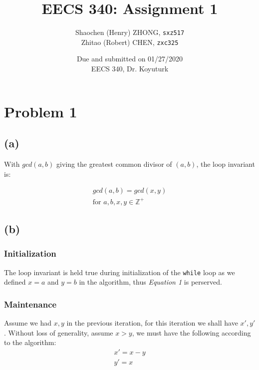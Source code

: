 \documentclass[12pt]{article}
\newcommand{\inlinecode}{\texttt}
\begin{document}
\title{\textbf{EECS 340: Assignment 1}}

\author{Shaochen (Henry) ZHONG, \inlinecode{sxz517} \\ Zhitao (Robert) CHEN, \inlinecode{zxc325}}
\date{Due and submitted on 01/27/2020 \\ EECS 340, Dr. Koyuturk}
\maketitle

\section{Problem 1}
\subsection{(a)}
With $gcd(a, b)$ giving the greatest common divisor of $(a, b)$, the loop invariant is:

\begin{gather}
    gcd(a, b) = gcd(x, y) \\
    \text{for $a, b, x, y \in \mathbb{Z^+}$}\nonumber
\end{gather}




\subsection{(b)}
\subsubsection{Initialization}

The loop invariant is held true during initialization of the \inlinecode{while} loop as we defined $x = a$ and $y = b$ in the algorithm, thus \textit{Equation 1} is perserved.

\subsubsection{Maintenance}

Assume we had $x, y$ in the previous iteration, for this iteration we shall have $x', y'$. Without loss of generality, assume $x > y$, we must have the following according to the algorithm:
\begin{gather}
    x' = x - y \nonumber\\
    y' = x \nonumber
\end{gather}
\end{document}
